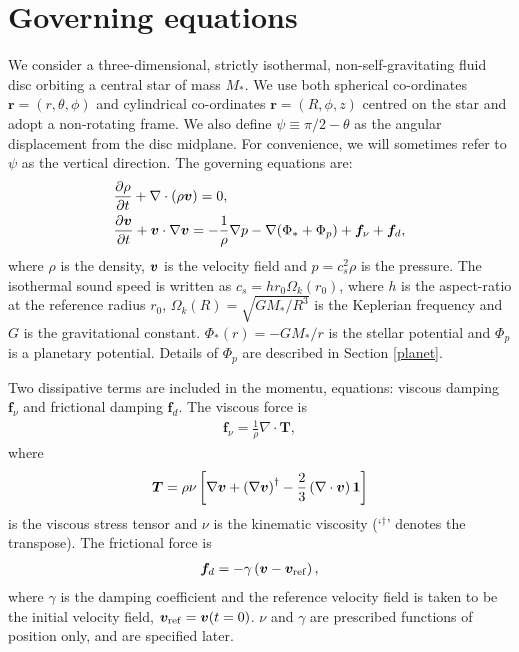 \section{Governing equations}
We consider a three-dimensional, strictly isothermal, non-self-gravitating fluid disc orbiting a central
star of mass $M_*$. We use both spherical co-ordinates $\bm{r}=(r,\theta,\phi)$ and cylindrical co-ordinates 
$\bm{r}=(R, \phi, z)$ centred on the star and 
adopt a non-rotating frame. We also define $\psi \equiv \pi/2 -
\theta$ as the angular displacement from the disc midplane. For
convenience, we will sometimes refer to $\psi$ as the vertical
direction. The governing
equations are: 
\begin{align}
&\frac{\partial\rho}{\partial t} + \nabla\cdot\left(\rho\bm{v}\right) = 0,\label{cont_eq}\\
&\frac{\partial\bm{v}}{\partial t} + \bm{v}\cdot\nabla\bm{v} = -\frac{1}{\rho}\nabla p -\nabla{\left(\Phi_*+\Phi_p\right)} 
 +\bm{f}_\nu + \bm{f}_d, 
\end{align}
where $\rho$ is the density, $\bm{v}$ is the velocity field and 
$p=c_s^2\rho$ is the pressure. The isothermal sound speed is written
as $c_s = hr_0\Omega_k(r_0)$, where $h$ is the aspect-ratio at the reference radius $r_0$, 
$\Omega_k(R) = \sqrt{GM_*/R^3}$ is the Keplerian frequency and $G$ is the gravitational constant. 
$\Phi_*(r) = -GM_*/r $ is the stellar potential and $\Phi_p$ is a
planetary potential. Details of $\Phi_p$ are described in Section
\ref{planet}. 

Two dissipative terms are included in the momentu, equations: viscous
damping $\bm{f}_\nu$ and frictional damping $\bm{f}_d$. The viscous
force is 
\begin{align}
  \bm{f}_\nu = \frac{1}{\rho}\nabla\cdot\bm{T},
\end{align}
where 
\begin{align}
  \bm{T} = \rho\nu \left[\nabla\bm{v} + \left(\nabla\bm{v}\right)^\dagger
    - \frac{2}{3}\left(\nabla\cdot\bm{v}\right)\bm{1} \right]
\end{align}
is the viscous stress tensor and $\nu$ is the kinematic viscosity 
(`$^\dagger$' denotes the transpose). The frictional force is
\begin{align}
  \bm{f}_d = -\gamma\left(\bm{v} - \bm{v}_\mathrm{ref}\right),
\end{align}
where $\gamma$ is the damping coefficient and the reference velocity field is taken 
to be the initial velocity field, $\bm{v}_\mathrm{ref}=\bm{v}(t=0)$. %
$\nu$ and $\gamma$ are prescribed functions of position only, and are
specified later.   

